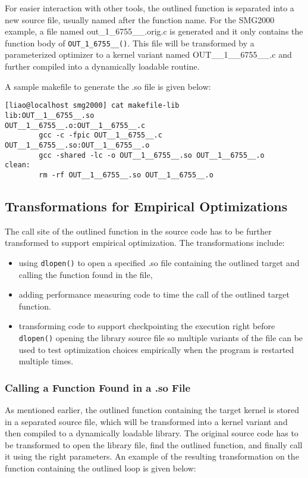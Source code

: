 For easier interaction with other tools, the outlined function is separated
into a new source file, usually named after 
the function name.  For the SMG2000 example, a file named out\_1\_6755\_\_.orig.c 
is generated and it only contains the function body of \lstinline{OUT_1_6755__()}. 
This file will be transformed by a parameterized optimizer to a kernel
variant named OUT\_\_1\_\_6755\_\_.c and further compiled into a dynamically
loadable routine.

A sample makefile to generate the .so file is given below: 
{\mySmallFontSize
\begin{verbatim}
[liao@localhost smg2000] cat makefile-lib
lib:OUT__1__6755__.so
OUT__1__6755__.o:OUT__1__6755__.c
        gcc -c -fpic OUT__1__6755__.c
OUT__1__6755__.so:OUT__1__6755__.o
        gcc -shared -lc -o OUT__1__6755__.so OUT__1__6755__.o
clean:
        rm -rf OUT__1__6755__.so OUT__1__6755__.o
\end{verbatim}
}

\subsection{Transformations for Empirical Optimizations}
The call site of the outlined function in the source code has to be further transformed to support empirical optimization. The transformations include:
\begin{itemize}
\item using \lstinline{dlopen()} to open a specified .so file containing
the outlined target and calling the function found in the file,
\item adding performance measuring code to time the call of the outlined target function.
\item transforming code to support checkpointing the execution right before
\lstinline{dlopen()} opening the library source file so multiple variants of the file can be used to test optimization choices empirically when the program is restarted multiple times.
\end{itemize}
\subsubsection{Calling a Function Found in a .so File}
As mentioned earlier, the outlined function containing the target kernel is
stored in a separated source file, which will be transformed into a kernel variant
and then compiled to a dynamically loadable library. 
The original source code has to be transformed to open the library file,
find the outlined function, and finally call it using the right
parameters. An example of the resulting transformation on the function containing the
outlined loop is given below:


